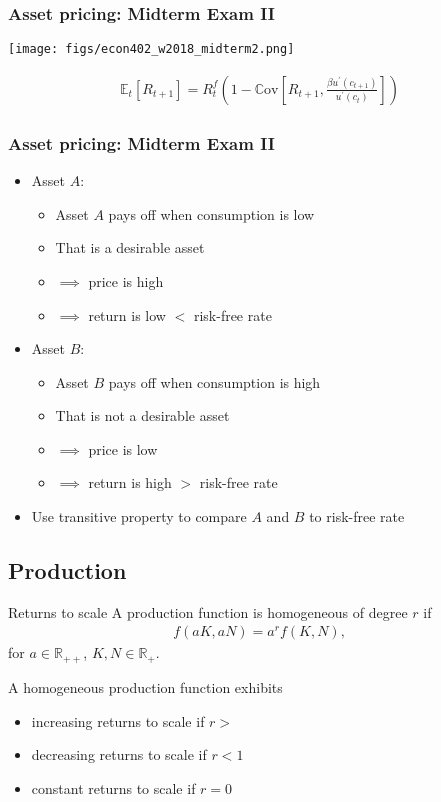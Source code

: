 \documentclass[presentation,dvipsnames]{beamer}
\begin{document}
\begin{frame}
\frametitle{Asset pricing: Midterm Exam II}
\centerline{\texttt{[image: figs/econ402\_w2018\_midterm2.png]}}
\begin{align*}
\mathbb{E}_{t} \left[ R_{t+1} \right] = R^{f}_{t} \left( 1 - \mathbb{C} \text{ov} \left[ R_{t+1}, \frac{\beta u^{\prime}(c_{t+1})}{u^{\prime}(c_{t})} \right] \right)
\end{align*}
\end{frame}

\begin{frame}
\frametitle{Asset pricing: Midterm Exam II}
\begin{itemize}
\item Asset $A$:
\begin{itemize}[label={--}]
\item Asset $A$ pays off when consumption is low
\item That is a desirable asset
\item $\implies$ price is high
\item $\implies$ return is low $<$ risk-free rate
\end{itemize}
\item Asset $B$:
\begin{itemize}[label={--}]
\item Asset $B$ pays off when consumption is high
\item That is not a desirable asset
\item $\implies$ price is low
\item $\implies$ return is high $>$ risk-free rate
\end{itemize}
\item Use transitive property to compare $A$ and $B$ to risk-free rate
\end{itemize}
\end{frame}

\subsection{Production}
\begin{frame}[label=sec-2-6]{Returns to scale}
A production function is homogeneous of degree $r$ if
\begin{align*}
f(aK,aN) = a^{r} f(K,N),
\end{align*}
for $a \in \mathbb{R}_{++}$, $K,N \in \mathbb{R}_{+}$.

A homogeneous production function exhibits
\begin{itemize}[label={--}]
\item increasing returns to scale if $r > $
\item decreasing returns to scale if $r < 1$
\item constant returns to scale if $r = 0$
\end{itemize}
\end{frame}
\end{document}
